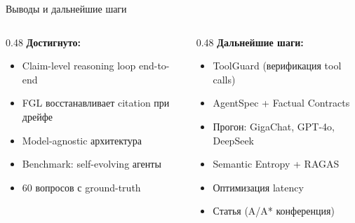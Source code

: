 \documentclass[aspectratio=169, 12pt]{beamer}
\begin{document}
\begin{frame}{Выводы и дальнейшие шаги}
  \small
  \begin{columns}[T]
    \begin{column}{0.48\textwidth}
      \textbf{Достигнуто:}
      \begin{itemize}\setlength\itemsep{3pt}
        \item[\textcolor{okgreen}{\checkmark}] Claim-level reasoning loop end-to-end
        \item[\textcolor{okgreen}{\checkmark}] FGL восстанавливает citation при дрейфе
        \item[\textcolor{okgreen}{\checkmark}] Model-agnostic архитектура
        \item[\textcolor{okgreen}{\checkmark}] Benchmark: self-evolving агенты
        \item[\textcolor{okgreen}{\checkmark}] 60 вопросов с ground-truth
      \end{itemize}
    \end{column}
    \begin{column}{0.48\textwidth}
      \textbf{Дальнейшие шаги:}
      \begin{itemize}\setlength\itemsep{3pt}
        \item ToolGuard (верификация tool calls)
        \item AgentSpec + Factual Contracts
        \item Прогон: GigaChat, GPT-4o, DeepSeek
        \item Semantic Entropy + RAGAS
        \item Оптимизация latency
        \item Статья (A/A* конференция)
      \end{itemize}
    \end{column}
  \end{columns}
\end{frame}
\end{document}
